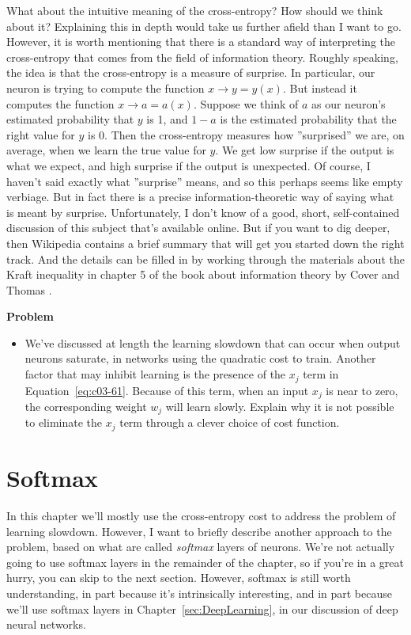 What about the intuitive meaning of the cross-entropy? How should we think about it? Explaining this in depth would take us further afield than I want to go. However, it is worth mentioning that there is a standard way of interpreting the cross-entropy that comes from the field of information theory. Roughly speaking, the idea is that the cross-entropy is a measure of surprise. In particular, our neuron is trying to compute the function $x \rightarrow y=y(x)$. But instead it computes the function $x \rightarrow a=a(x)$. Suppose we think of $a$ as our neuron's estimated probability that $y$ is 1, and $1-a$ is the estimated probability that the right value for $y$ is 0. Then the cross-entropy measures how ''surprised'' we are, on average, when we learn the true value for $y$. We get low surprise if the output is what we expect, and high surprise if the output is unexpected. Of course, I haven't said exactly what ''surprise'' means, and so this perhaps seems like empty verbiage. But in fact there is a precise information-theoretic way of saying what is meant by surprise. Unfortunately, I don't know of a good, short, self-contained discussion of this subject that's available online. But if you want to dig deeper, then Wikipedia contains a brief summary \cite{wikipediaCrossentropy2019} that will get you started down the right track. And the details can be filled in by working through the materials about the Kraft inequality in chapter 5 of the book about information theory by Cover and Thomas \cite{Cover2006}.

\textbf{Problem}

\begin{itemize}
\item  We've discussed at length the learning slowdown that can occur when output neurons saturate, in networks using the quadratic cost to train. Another factor that may inhibit learning is the presence of the $x_j$ term in Equation~\ref{eq:c03-61}. Because of this term, when an input $x_j$ is near to zero, the corresponding weight $w_j$ will learn slowly. Explain why it is not possible to eliminate the $x_j$ term through a clever choice of cost function. 
\end{itemize}

\section{Softmax}
\label{sec:softmax}

In this chapter we'll mostly use the cross-entropy cost to address the problem of learning slowdown. However, I want to briefly describe another approach to the problem, based on what are called \textit{softmax} layers of neurons. We're not actually going to use softmax layers in the remainder of the chapter, so if you're in a great hurry, you can skip to the next section. However, softmax is still worth understanding, in part because it's intrinsically interesting, and in part because we'll use softmax layers in Chapter~\ref{sec:DeepLearning}, in our discussion of deep neural networks.

